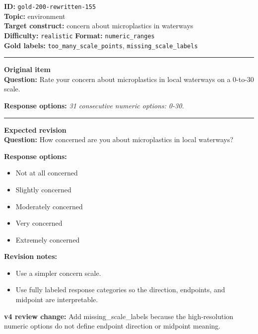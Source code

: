 \documentclass[10pt,a4paper]{article}
\newcommand{\sectionline}{\vspace{0.15em}\hrule\vspace{0.35em}}
\begin{document}
\begin{tcolorbox}[colframe=FlawRed,colback=white,colbacktitle=FlawRed!9,coltitle=black,title={Item 155\hfill Flawed item}]
\textbf{ID:} \texttt{gold-200-rewritten-155}\\
\textbf{Topic:} environment\\
\textbf{Target construct:} concern about microplastics in waterways\\
\textbf{Difficulty:} \texttt{realistic} \quad \textbf{Format:} \texttt{numeric\_ranges}\\
\textbf{Gold labels:} \texttt{too\_many\_scale\_points}, \texttt{missing\_scale\_labels}\\
\sectionline
\textbf{Original item}\\
\textbf{Question:} Rate your concern about microplastics in local waterways on a 0-to-30 scale.
\par\textbf{Response options:}
\textit{31 consecutive numeric options: 0-30.}
\sectionline
\textbf{Expected revision}\\
\textbf{Question:} How concerned are you about microplastics in local waterways?
\par\textbf{Response options:}
\begin{itemize}
\item Not at all concerned
\item Slightly concerned
\item Moderately concerned
\item Very concerned
\item Extremely concerned
\end{itemize}
\par\textbf{Revision notes:}
\begin{itemize}
\item Use a simpler concern scale.
\item Use fully labeled response categories so the direction, endpoints, and midpoint are interpretable.
\end{itemize}
\par\textbf{v4 review change:} Add missing\_scale\_labels because the high-resolution numeric options do not define endpoint direction or midpoint meaning.
\end{tcolorbox}
\end{document}
